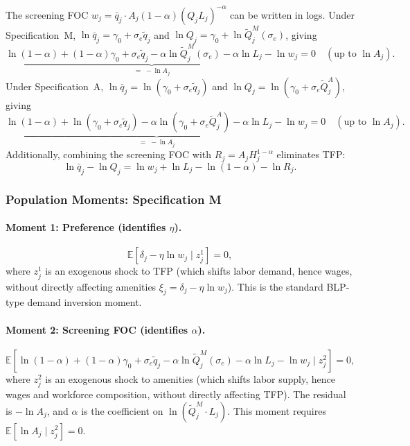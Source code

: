 \documentclass[11pt]{article}
\begin{document}
The screening FOC $w_j = \bar q_j \cdot A_j(1-\alpha)(Q_jL_j)^{-\alpha}$ can be written in logs. Under Specification~M, $\ln\bar q_j = \gamma_0 + \sigma_e\tilde q_j$ and $\ln Q_j = \gamma_0 + \ln\tilde Q_j^M(\sigma_e)$, giving
\begin{equation}\label{eq:screen_log_M}
\underbrace{\ln(1-\alpha) + (1-\alpha)\gamma_0 + \sigma_e\tilde q_j - \alpha\ln\tilde Q_j^M(\sigma_e) - \alpha\ln L_j - \ln w_j}_{=\; -\ln A_j} = 0 \quad (\text{up to } \ln A_j).
\end{equation}
Under Specification~A, $\ln\bar q_j = \ln(\gamma_0+\sigma_e\tilde q_j)$ and $\ln Q_j = \ln(\gamma_0 + \sigma_e\tilde Q_j^A)$, giving
\begin{equation}\label{eq:screen_log_A}
\underbrace{\ln(1-\alpha) + \ln(\gamma_0+\sigma_e\tilde q_j) - \alpha\ln(\gamma_0+\sigma_e\tilde Q_j^A) - \alpha\ln L_j - \ln w_j}_{=\; -\ln A_j} = 0 \quad (\text{up to } \ln A_j).
\end{equation}
Additionally, combining the screening FOC with $R_j = A_j H_j^{1-\alpha}$ eliminates TFP:
\begin{equation}\label{eq:Aj_free}
\ln\bar q_j - \ln Q_j = \ln w_j + \ln L_j - \ln(1-\alpha) - \ln R_j.
\end{equation}

\subsubsection{Population Moments: Specification M}\label{sec:moments_M}

\paragraph{Moment 1: Preference (identifies $\eta$).}
\begin{equation}\label{eq:m1_M}
\mathbb{E}\!\left[\delta_j - \eta\ln w_j \;\Big|\; z_j^1\right] = 0,
\end{equation}
where $z_j^1$ is an exogenous shock to TFP (which shifts labor demand, hence wages, without directly affecting amenities $\xi_j = \delta_j - \eta\ln w_j$). This is the standard BLP-type demand inversion moment.

\paragraph{Moment 2: Screening FOC (identifies $\alpha$).}
\begin{equation}\label{eq:m2_M}
\mathbb{E}\!\left[\ln(1-\alpha) + (1-\alpha)\gamma_0 + \sigma_e\tilde q_j - \alpha\ln\tilde Q_j^M(\sigma_e) - \alpha\ln L_j - \ln w_j \;\Big|\; z_j^2\right] = 0,
\end{equation}
where $z_j^2$ is an exogenous shock to amenities (which shifts labor supply, hence wages and workforce composition, without directly affecting TFP). The residual is $-\ln A_j$, and $\alpha$ is the coefficient on $\ln(\tilde Q_j^M \cdot L_j)$. This moment requires $\mathbb{E}[\ln A_j \mid z_j^2]=0$.
\end{document}

